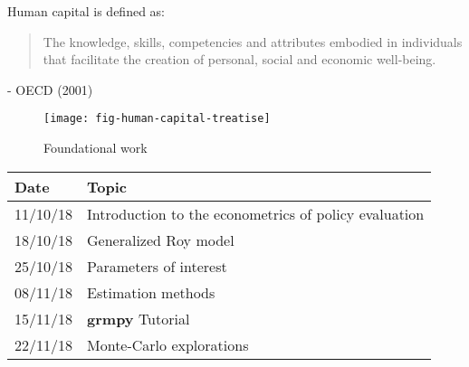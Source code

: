 \begin{frame}
Human capital is defined as:
\vspace{\baselineskip}

\begin{quote}
The knowledge, skills, competencies and attributes embodied in individuals that facilitate
the creation of personal, social and economic well-being.
\end{quote}\vspace{-0.5pt} \hspace{6cm} - OECD (2001)
\end{frame}

\begin{frame}
	\begin{figure}
		\caption{Foundational work}
		\centering\texttt{[image: fig-human-capital-treatise]}
	\end{figure}
\end{frame}
\begin{frame}
\centering
\begin{threeparttable}\footnotesize
  \caption{Lecture plan}
  \begin{tabular}{ll}\toprule
  Date & Topic \\\midrule
   11/10/18  & Introduction to the econometrics of policy evaluation  \\
   18/10/18  & Generalized Roy model                                  \\
   25/10/18  & Parameters of interest                                 \\
   08/11/18  & Estimation methods                                     \\
   15/11/18  & \textbf{grmpy} Tutorial                                       \\
   22/11/18  & Monte-Carlo explorations                               \\
\bottomrule
\end{tabular}
\end{threeparttable}
\end{frame}

